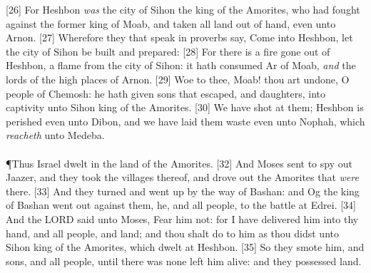 [26] \textcolor[cmyk]{0.99998,1,0,0}{For Heshbon \emph{was} the city of Sihon the king of the Amorites, who had fought against the former king of Moab, and taken all  land out of  hand, even unto Arnon.}
[27] \textcolor[cmyk]{0.99998,1,0,0}{Wherefore they that speak in proverbs say, Come into Heshbon, let the city of Sihon be built and prepared:}
[28] \textcolor[cmyk]{0.99998,1,0,0}{For there is a fire gone out of Heshbon, a flame from the city of Sihon: it hath consumed Ar of Moab, \emph{and} the lords of the high places of Arnon.}
[29] \textcolor[cmyk]{0.99998,1,0,0}{Woe to thee, Moab! thou art undone, O people of Chemosh: he hath given  sons that escaped, and  daughters, into captivity unto Sihon king of the Amorites.}
[30] \textcolor[cmyk]{0.99998,1,0,0}{We have shot at them; Heshbon is perished even unto Dibon, and we have laid them waste even unto Nophah, which \emph{reacheth} unto Medeba.}\\
\\
\P \textcolor[cmyk]{0.99998,1,0,0}{Thus Israel dwelt in the land of the Amorites.}
[32] \textcolor[cmyk]{0.99998,1,0,0}{And Moses sent to spy out Jaazer, and they took the villages thereof, and drove out the Amorites that \emph{were} there.}
[33] \textcolor[cmyk]{0.99998,1,0,0}{And they turned and went up by the way of Bashan: and Og the king of Bashan went out against them, he, and all  people, to the battle at Edrei.}
[34] \textcolor[cmyk]{0.99998,1,0,0}{And the LORD said unto Moses, Fear him not: for I have delivered him into thy hand, and all  people, and  land; and thou shalt do to him as thou didst unto Sihon king of the Amorites, which dwelt at Heshbon.}
[35] \textcolor[cmyk]{0.99998,1,0,0}{So they smote him, and  sons, and all  people, until there was none left him alive: and they possessed  land.}